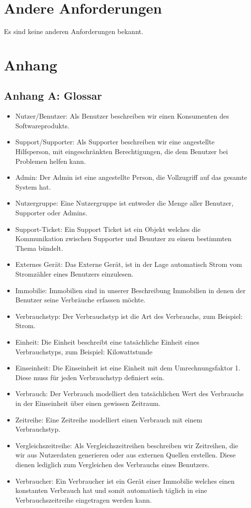\section{Andere Anforderungen}
Es sind keine anderen Anforderungen bekannt.
\newpage
\section{Anhang}
\subsection*{Anhang A: Glossar}
\label{glossar}
\begin{itemize}
	\item Nutzer/Benutzer: Als Benutzer beschreiben wir einen Konsumenten des Softwareprodukts.
	\item Support/Supporter: Als Supporter beschreiben wir eine angestellte Hilfsperson, mit eingeschränkten Berechtigungen, die dem Benutzer bei Problemen helfen kann.
	\item Admin: Der Admin ist eine angestellte Person, die Vollzugriff auf das gesamte System hat.
	\item Nutzergruppe: Eine Nutzergruppe ist entweder die Menge aller Benutzer, Supporter oder Admins.
	\item Support-Ticket: Ein Support Ticket ist ein Objekt welches die Kommunikation zwischen Supporter und Benutzer zu einem bestimmten Thema bündelt.
	\item Externes Gerät: Das Externe Gerät, ist in der Lage automatisch Strom vom Stromzähler eines Benutzers einzulesen.
	\item Immobilie: Immobilien sind in unserer Beschreibung Immobilien in denen der Benutzer seine Verbräuche erfassen möchte.
	\item Verbrauchstyp: Der Verbrauchstyp ist die Art des Verbrauchs, zum Beispiel: Strom.
	\item Einheit: Die Einheit beschreibt eine tatsächliche Einheit eines Verbrauchstyps, zum Beispiel: Kilowattstunde
	\item Einseinheit: Die Einseinheit ist eine Einheit mit dem Umrechnungsfaktor 1. Diese muss für jeden Verbrauchstyp definiert sein.
	\item Verbrauch: Der Verbrauch modelliert den tatsächlichen Wert des Verbrauchs in der Einseinheit über einen gewissen Zeitraum.
	\item Zeitreihe: Eine Zeitreihe modelliert einen Verbrauch mit einem Verbrauchstyp.
	\item Vergleichszeitreihe: Als Vergleichszeitreihen beschreiben wir Zeitreihen, die wir aus Nutzerdaten generieren oder aus externen Quellen erstellen. Diese dienen lediglich zum Vergleichen des Verbrauchs eines Benutzers.
	\item Verbraucher: Ein Verbraucher ist ein Gerät einer Immobilie welches einen konstanten Verbrauch hat und somit automatisch täglich in eine Verbrauchszeitreihe eingetragen werden kann.
\end{itemize}
